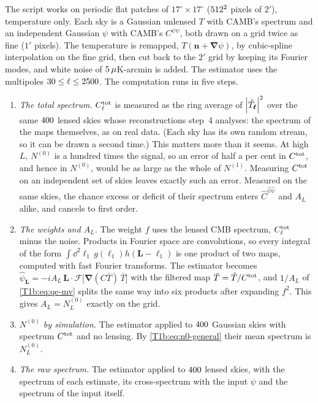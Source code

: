The script  works on periodic flat patches of $17^\circ\times17^\circ$ ($512^2$ pixels of $2'$), temperature only. Each sky is a Gaussian unlensed $T$ with CAMB's spectrum and an independent Gaussian $\psi$ with CAMB's $C^{\psi\psi}$, both drawn on a grid twice as fine ($1'$ pixels). The temperature is remapped, $T(\bm n+\bm\nabla\psi)$, by cubic-spline interpolation on the fine grid, then cut back to the $2'$ grid by keeping its Fourier modes, and white noise of $5\,\mu$K-arcmin is added. The estimator uses the multipoles $30\le\ell\le2500$. The computation runs in five steps.
\begin{enumerate}[leftmargin=1.6em,itemsep=2pt]
\item \emph{The total spectrum.} $C^{\rm tot}_\ell$ is measured as the ring average of $\left\lvert \hat T_{\bm\ell}\right\rvert^2$ over the same $400$ lensed skies whose reconstructions step~4 analyses: the spectrum of the maps themselves, as on real data. (Each sky has its own random stream, so it can be drawn a second time.) This matters more than it seems. At high $L$, $N^{(0)}$ is a hundred times the signal, so an error of half a per cent in $C^{\rm tot}$, and hence in $N^{(0)}$, would be as large as the whole of $N^{(1)}$. Measuring $C^{\rm tot}$ on an independent set of skies leaves exactly such an error. Measured on the same skies, the chance excess or deficit of their spectrum enters $\hat C^{\hat\psi\hat\psi}$ and $A_L$ alike, and cancels to first order.
\item \emph{The weights and $A_L$.} The weight $f$ uses the lensed CMB spectrum, $C^{\rm tot}_\ell$ minus the noise. Products in Fourier space are convolutions, so every integral of the form $\int\dd^2\ell_1\,g(\bm\ell_1)h(\bm L-\bm\ell_1)$ is one product of two maps, computed with fast Fourier transforms. The estimator becomes $\hat\psi_{\bm L}=-iA_L\,\bm L\cdot\mathcal F\bigl[\bm\nabla(C\bar T)\,\bar T\bigr]$ with the filtered map $\bar T=\hat T/C^{\rm tot}$, and $1/A_L$ of \eqref{T1b:eq:qe-mv} splits the same way into six products after expanding $f^2$. This gives $A_L=N^{(0)}_L$ exactly on the grid.
\item \emph{$N^{(0)}$ by simulation.} The estimator applied to $400$ Gaussian skies with spectrum $C^{\rm tot}$ and no lensing. By \eqref{T1b:eq:n0-general} their mean spectrum is $N^{(0)}_L$.
\item \emph{The raw spectrum.} The estimator applied to $400$ lensed skies, with the spectrum of each estimate, its cross-spectrum with the input $\psi$ and the spectrum of the input itself.

\end{enumerate}
